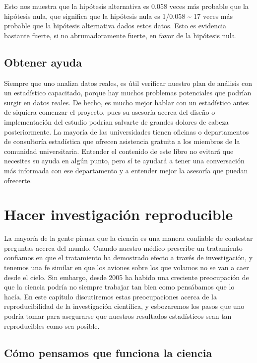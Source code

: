 \documentclass[
  12pt,
]{book}
\theoremstyle{definition}
\theoremstyle{definition}
\theoremstyle{definition}
\theoremstyle{remark}
\begin{document}
Esto nos muestra que la hipótesis alternativa es 0.058 veces más probable que la hipótesis nula, que significa que la hipótesis nula es 1/0.058 \textasciitilde{} 17 veces más probable que la hipótesis alternativa dados estos datos. Esto es evidencia bastante fuerte, si no abrumadoramente fuerte, en favor de la hipótesis nula.

\hypertarget{obtener-ayuda}{%
\section{Obtener ayuda}\label{obtener-ayuda}}

Siempre que uno analiza datos reales, es útil verificar nuestro plan de análisis con un estadístico capacitado, porque hay muchos problemas potenciales que podrían surgir en datos reales. De hecho, es mucho mejor hablar con un estadístico antes de siquiera comenzar el proyecto, pues su asesoría acerca del diseño o implementación del estudio podrían salvarte de grandes dolores de cabeza posteriormente. La mayoría de las universidades tienen oficinas o departamentos de consultoría estadística que ofrecen asistencia gratuita a los miembros de la comunidad universitaria. Entender el contenido de este libro no evitará que necesites su ayuda en algún punto, pero sí te ayudará a tener una conversación más informada con ese departamento y a entender mejor la asesoría que puedan ofrecerte.

\hypertarget{doing-reproducible-research}{%
\chapter{Hacer investigación reproducible}\label{doing-reproducible-research}}

La mayoría de la gente piensa que la ciencia es una manera confiable de contestar preguntas acerca del mundo. Cuando nuestro médico prescribe un tratamiento confiamos en que el tratamiento ha demostrado efecto a través de investigación, y tenemos una fe similar en que los aviones sobre los que volamos no se van a caer desde el cielo. Sin embargo, desde 2005 ha habido una creciente preocupación de que la ciencia podría no siempre trabajar tan bien como pensábamos que lo hacía. En este capítulo discutiremos estas preocupaciones acerca de la reproducibilidad de la investigación científica, y esbozaremos los pasos que uno podría tomar para asegurarse que nuestros resultados estadísticos sean tan reproducibles como sea posible.

\hypertarget{cuxf3mo-pensamos-que-funciona-la-ciencia}{%
\section{Cómo pensamos que funciona la ciencia}\label{cuxf3mo-pensamos-que-funciona-la-ciencia}}
\end{document}
